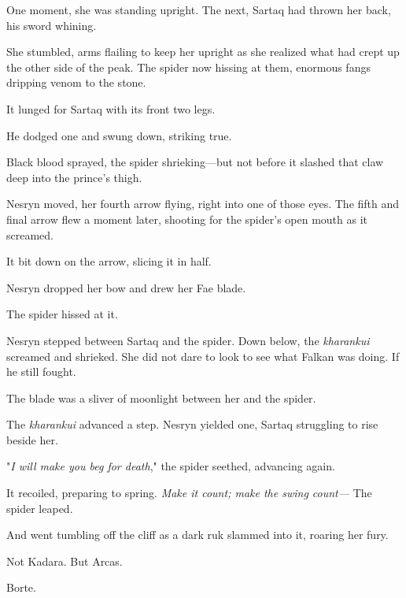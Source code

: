 One moment, she was standing upright.
The next, Sartaq had thrown her back, his sword whining.

She stumbled, arms flailing to keep her upright as she realized what had crept up the other side of the peak.
The spider now hissing at them, enormous fangs dripping venom to the stone.

It lunged for Sartaq with its front two legs.

He dodged one and swung down, striking true.

Black blood sprayed, the spider shrieking---but not before it slashed that claw deep into the prince's thigh.

Nesryn moved, her fourth arrow flying, right into one of those eyes.
The fifth and final arrow flew a moment later, shooting for the spider's open mouth as it screamed.

It bit down on the arrow, slicing it in half.

Nesryn dropped her bow and drew her Fae blade.

The spider hissed at it.

Nesryn stepped between Sartaq and the spider.
Down below, the \emph{kharankui} screamed and shrieked.
She did not dare to look to see what Falkan was doing.
If he still fought.

The blade was a sliver of moonlight between her and the spider.

The \emph{kharankui} advanced a step.
Nesryn yielded one, Sartaq struggling to rise beside her.

"\emph{I will make you beg for death}," the spider seethed, advancing again.

It recoiled, preparing to spring.
\emph{Make it count; make the swing count---} The spider leaped.

And went tumbling off the cliff as a dark ruk slammed into it, roaring her fury.

Not Kadara.
But Arcas.

Borte.

